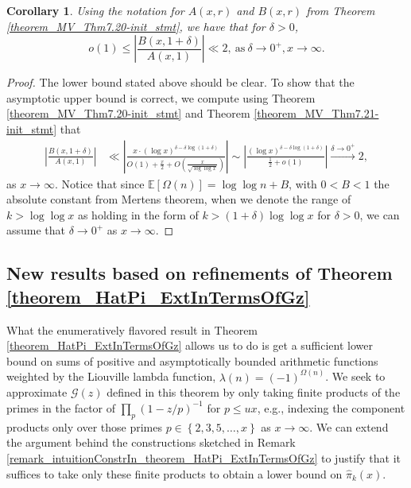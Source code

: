 \documentclass[11pt,reqno,a4letter]{article}
\numberwithin{figure}{section}
\numberwithin{table}{section}
\theoremstyle{plain}
\newtheorem{cor}[theorem]{Corollary}
\numberwithin{theorem}{section}
\theoremstyle{definition}
\begin{document}
\begin{cor} 
\label{theorem_MV_Thm7.20} 
Using the notation for $A(x, r)$ and $B(x, r)$ from 
Theorem \ref{theorem_MV_Thm7.20-init_stmt}, 
we have that for $\delta > 0$, 
\[
o(1) \leq \left\lvert \frac{B(x, 1+\delta)}{A(x, 1)} \right\rvert \ll 2, 
     \mathrm{\ as\ } \delta \rightarrow 0^{+}, x \rightarrow \infty. 
\]
\end{cor} 
\begin{proof} 
The lower bound stated above should be clear. To show that the asymptotic 
upper bound is correct, we compute using Theorem \ref{theorem_MV_Thm7.20-init_stmt} and 
Theorem \ref{theorem_MV_Thm7.21-init_stmt} that 
\begin{align*} 
\left\lvert \frac{B(x, 1+\delta)}{A(x, 1)} \right\rvert & \ll 
     \left\lvert \frac{x \cdot (\log x)^{\delta - \delta\log(1+\delta)}}{ 
     O(1) + \frac{x}{2} + 
     O\left(\frac{x}{\sqrt{\log\log x}}\right)} \right\rvert 
     \sim 
     \left\lvert \frac{(\log x)^{\delta - \delta\log(1+\delta)}}{ 
     \frac{1}{2} + o(1)}\right\rvert 
     \xrightarrow{\delta \rightarrow 0^{+}} 2, 
\end{align*} 
as $x \rightarrow \infty$. Notice that since $\mathbb{E}[\Omega(n)] = \log\log n + B$, with $0 < B < 1$ the 
absolute constant from Mertens theorem, 
when we denote the range of $k > \log\log x$ as holding in the form of 
$k > (1 + \delta) \log\log x$ for $\delta > 0$, we can assume that $\delta \rightarrow 0^{+}$ as 
$x \rightarrow \infty$. 
\end{proof} 

\subsection{New results based on refinements of Theorem \ref{theorem_HatPi_ExtInTermsOfGz}} 
\label{subSection_PartialPrimeProducts_Proofs} 

What the enumeratively flavored result 
in Theorem \ref{theorem_HatPi_ExtInTermsOfGz} allows us to do is get a 
sufficient lower bound on sums of positive and asymptotically bounded arithmetic functions 
weighted by the Liouville lambda function, $\lambda(n) = (-1)^{\Omega(n)}$. 
We seek to approximate $\mathcal{G}(z)$ defined in this theorem 
by only taking finite products of the primes in the factor of 
$\prod_{p} (1 - z/p)^{-1}$ for 
$p \leq ux$, e.g., indexing the component products only over those primes 
$p \in \left\{2,3,5,\ldots,x\right\}$ as $x \rightarrow \infty$. 
We can extend the argument behind the constructions sketched in 
Remark \ref{remark_intuitionConstrIn_theorem_HatPi_ExtInTermsOfGz} to 
justify that it suffices to take only these finite products to obtain a lower bound on 
$\widehat{\pi}_k(x)$. 
\end{document}
